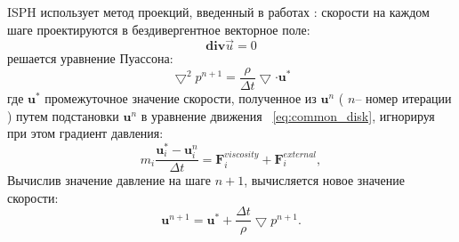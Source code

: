 ISPH использует метод проекций, введенный в работах \cite {Temam1968, Chorin1968}: скорости на каждом шаге проектируются в бездивергентное векторное поле:
\[
  \boldsymbol{div}\vec{u}=0
\]
решается уравнение Пуассона:
\begin{equation}
  \label{eq:puasson}
  \bigtriangledown^{2} p^{n+1}=\frac{\rho}{\Delta t}\bigtriangledown \cdot \boldsymbol{u}^{*}
\end{equation}
где \(\boldsymbol{u}^{*}\) промежуточное значение скорости, полученное из \(\boldsymbol{u}^{n}\) ( \(n\)– номер итерации ) путем подстановки \(\boldsymbol{u}^{n}\) в уравнение движения ~\ref{eq:common_disk}, игнорируя при этом градиент давления:
\[
  m_i\frac{\textbf{u}_{i}^{*} -\textbf{u}_{i}^{n}}{\Delta t} = \mathbf{F}_i^{viscosity} + \mathbf{F}_i^{external},
\]
Вычислив значение давление на шаге \( n+1 \), вычисляется новое значение скорости:
\[
  \textbf{u}^{n+1}=\textbf{u}^{*}+\frac{\Delta t}{\rho}\bigtriangledown p^{n+1}.
\]

